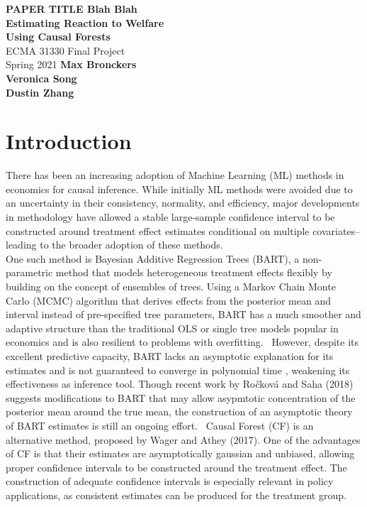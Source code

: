 \documentclass[12pt]{article}
\begin{document}
\begin{titlepage}
    \begin{center}
        \vspace*{1cm}
        \LARGE
        \textbf{PAPER TITLE Blah Blah\\ Estimating Reaction to Welfare\\ Using Causal Forests\\}
        \vspace{0.5cm}
        \Large
        ECMA 31330 Final Project \\ 
        \vspace{0.8cm}
        \large
        Spring 2021
        \vfill
        \vspace{5cm}
        \textbf{Max Bronckers \\ Veronica Song \\ Dustin Zhang}
    \end{center}
\end{titlepage}

\tableofcontents

\clearpage
\section{Introduction} 
There has been an increasing adoption of Machine Learning (ML) methods in
economics for causal inference. While initially ML methods were avoided due to
an uncertainty in their consistency, normality, and efficiency, major developments in
methodology have allowed a stable large-sample confidence interval to be
constructed around treatment effect estimates conditional on multiple
covariates--leading to the broader adoption of these methods.~\cite{athey2019ML} \\

One such method is Bayesian Additive Regression Trees (BART), a non-parametric
method that models heterogeneous treatment effects flexibly by building on the
concept of ensembles of trees. Using a Markov Chain Monte Carlo (MCMC) algorithm
that derives effects from the posterior mean and interval instead of
pre-specified tree parameters, BART has a much smoother and adaptive structure
than the traditional OLS or single tree models popular in economics and is also
resilient to problems with overfitting.~\cite{greenkern2012} However, despite its
excellent predictive capacity, BART lacks an asymptotic explanation for its
estimates and is not guaranteed to converge in polynomial time
\cite{atheywager2019}, weakening its effectiveness as inference tool. Though
recent work by Ročková and Saha (2018) suggests modifications to BART that may
allow asypmtotic concentration of the posterior mean around the true mean, the
construction of an asymptotic theory of BART estimates is still an ongoing
effort.~\cite{rockova2018theory} Causal Forest (CF) is an alternative method,
proposed by Wager and Athey (2017). One of the advantages of CF is that their
estimates are asymptotically gaussian and unbiased, allowing proper confidence
intervals to be constructed around the treatment effect. The construction of
adequate confidence intervals is especially relevant in policy applications, as
consistent estimates can be produced for the treatment group.~\cite{atheywager2019} \\ 
\end{document}
